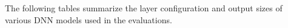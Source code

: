 
%


%
%
The following tables summarize the layer configuration and output sizes of various DNN models used in the evaluations.\\

